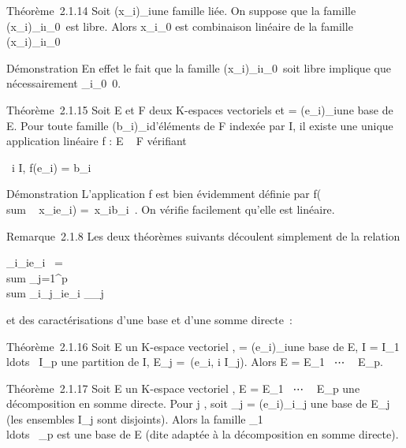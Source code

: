 Théorème~2.1.14 Soit (x_i)_i\inI une famille liée. On
suppose que la famille
(x_i)_i\inI\diagdown\i_0\
est libre. Alors x_i_0 est combinaison linéaire de la
famille
(x_i)_i\inI\diagdown\i_0\

Démonstration En effet le fait que la famille
(x_i)_i\inI\diagdown\i_0\
soit libre implique que nécessairement
\alpha_i_0\neq~0.

Théorème~2.1.15 Soit E et F deux K-espaces vectoriels et  =
(e_i)_i\inI une base de E. Pour toute famille
(b_i)_i\inI d'éléments de F indexée par I, il existe une
unique application linéaire f : E \rightarrow~ F vérifiant

\forall~i \in I, f(e_i) = b_i~

Démonstration L'application f est bien évidemment définie par
f(\\sum ~
x_ie_i) =\
\sum  x_ib_i~. On vérifie
facilement qu'elle est linéaire.

Remarque~2.1.8 Les deux théorèmes suivants découlent simplement de la
relation

\sum _i\inI\alpha_ie_i~ =
\\sum
_j=1^p\underbrace
\\sum
_i\inI_j\alpha_ie_i _\inE_j

et des caractérisations d'une base et d'une somme directe~:

Théorème~2.1.16 Soit E un K-espace vectoriel ,  =
(e_i)_i\inI une base de E, I = I_1
\cup\\ldots~ \cup
I_p une partition de I, E_j =\
\mathrmVect(e_i, i \in I_j). Alors
E = E_1 \oplus~⋯ \oplus~ E_p.

Théorème~2.1.17 Soit E un K-espace vectoriel , E = E_1
\oplus~⋯ \oplus~ E_p une décomposition en somme
directe. Pour j \in [1,p], soit _j =
(e_i)_i\inI_j une base de E_j (les
ensembles I_j sont disjoints). Alors la famille _1
\cup\\ldots~
\cup\mathcal{E}_p est une base de E (dite adaptée à la décomposition en
somme directe).
